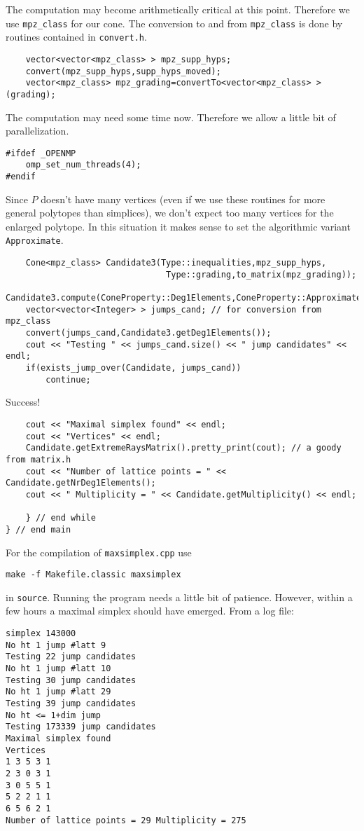 \documentclass[12pt,a4paper]{scrartcl}
\theoremstyle{definition}
\begin{document}
\begin{small}
The computation may become arithmetically critical at this point. Therefore we use \verb|mpz_class| for our cone. The conversion to and from \verb|mpz_class| is done by routines contained in \verb|convert.h|.
\begin{Verbatim}
    vector<vector<mpz_class> > mpz_supp_hyps;
    convert(mpz_supp_hyps,supp_hyps_moved);
    vector<mpz_class> mpz_grading=convertTo<vector<mpz_class> >(grading);
\end{Verbatim}
The computation may need some time now. Therefore we allow a little bit of parallelization.
\begin{Verbatim}
#ifdef _OPENMP
	omp_set_num_threads(4);
#endif
\end{Verbatim}
Since $P$ doesn't have many vertices (even if we use these routines for more general polytopes than simplices), we don't expect too many vertices for the enlarged polytope. In this situation it makes sense to set the algorithmic variant \verb|Approximate|.
\begin{Verbatim}
    Cone<mpz_class> Candidate3(Type::inequalities,mpz_supp_hyps,
                                Type::grading,to_matrix(mpz_grading));
    Candidate3.compute(ConeProperty::Deg1Elements,ConeProperty::Approximate);
    vector<vector<Integer> > jumps_cand; // for conversion from mpz_class                           
    convert(jumps_cand,Candidate3.getDeg1Elements());
    cout << "Testing " << jumps_cand.size() << " jump candidates" << endl;
    if(exists_jump_over(Candidate, jumps_cand))
        continue;
\end{Verbatim}
Success!
\begin{Verbatim}
    cout << "Maximal simplex found" << endl;
    cout << "Vertices" << endl;
    Candidate.getExtremeRaysMatrix().pretty_print(cout); // a goody from matrix.h
    cout << "Number of lattice points = " << Candidate.getNrDeg1Elements();
    cout << " Multiplicity = " << Candidate.getMultiplicity() << endl; 
    
    } // end while
} // end main
\end{Verbatim}

For the compilation of \verb|maxsimplex.cpp| use
\begin{Verbatim}
make -f Makefile.classic maxsimplex
\end{Verbatim}
in \verb|source|. Running the program needs a little bit of patience. However, within a few hours a maximal simplex should have emerged. From a log file:
\begin{Verbatim}
simplex 143000
No ht 1 jump #latt 9
Testing 22 jump candidates
No ht 1 jump #latt 10
Testing 30 jump candidates
No ht 1 jump #latt 29
Testing 39 jump candidates
No ht <= 1+dim jump
Testing 173339 jump candidates
Maximal simplex found
Vertices
1 3 5 3 1
2 3 0 3 1
3 0 5 5 1
5 2 2 1 1
6 5 6 2 1
Number of lattice points = 29 Multiplicity = 275
\end{Verbatim}

\end{small}
\end{document}
